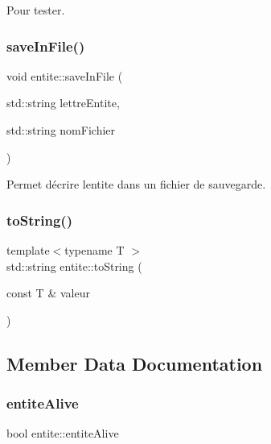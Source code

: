 Pour tester. 

\mbox{\label{classentite_a7bd09aa63160345500b6d6c4dca6cf52}} 
\subsubsection{\texorpdfstring{save\+In\+File()}{saveInFile()}}
{\footnotesize\ttfamily void entite\+::save\+In\+File (\begin{DoxyParamCaption}\item[{std\+::string}]{lettre\+Entite,  }\item[{std\+::string}]{nom\+Fichier }\end{DoxyParamCaption})}



Permet d\textquotesingle{}écrire l\textquotesingle{}entite dans un fichier de sauvegarde. 

\mbox{\label{classentite_ab77d3864b5cfed8364816e27b9eb7077}} 
\subsubsection{\texorpdfstring{to\+String()}{toString()}}
{\footnotesize\ttfamily template$<$typename T $>$ \\
std\+::string entite\+::to\+String (\begin{DoxyParamCaption}\item[{const T \&}]{valeur }\end{DoxyParamCaption})}



\subsection{Member Data Documentation}
\mbox{\label{classentite_a5a69c21a4435817f2d960e0811d4474e}} 
\subsubsection{\texorpdfstring{entite\+Alive}{entiteAlive}}
{\footnotesize\ttfamily bool entite\+::entite\+Alive\hspace{0.3cm}{\ttfamily [protected]}}

